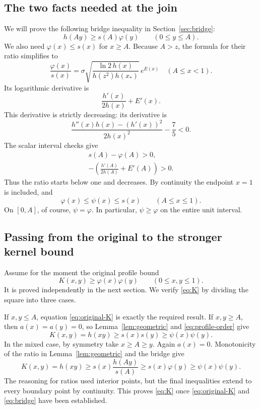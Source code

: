 \documentclass[11pt]{article}
\theoremstyle{remark}
\begin{document}
\subsection{The two facts needed at the join}
We will prove the following bridge inequality in
Section~\ref{sec:bridge}:
\begin{equation}\label{eq:bridge}
h(Ay)\ge s(A)\varphi(y)\qquad(0\le y\le A).
\end{equation}
We also need \(\varphi(x)\le s(x)\) for \(x\ge A\).
Because \(A>z\), the formula for their ratio simplifies to
\[
\frac{\varphi(x)}{s(x)}
=\sigma\sqrt{\frac{\ln2\,h(x)}{h(z^2)h(x_*)}}\,e^{E(x)}
\quad(A\le x<1).
\]
Its logarithmic derivative is
\[
\frac{h'(x)}{2h(x)}+E'(x).
\]
This derivative is strictly decreasing: its derivative is
\[
\frac{h''(x)h(x)-(h'(x))^2}{2h(x)^2}-\frac75<0.
\]
The scalar interval checks give
\begin{equation}\label{eq:tail-scalars}
\begin{gathered}
s(A)-\varphi(A)>0,\\
-\left(\frac{h'(A)}{2h(A)}+E'(A)\right)>0.
\end{gathered}
\end{equation}
Thus the ratio starts below one and decreases. By continuity the
endpoint \(x=1\) is included, and
\begin{equation}\label{eq:profile-order}
\varphi(x)\le\psi(x)\le s(x)\qquad(A\le x\le1).
\end{equation}
On \([0,A]\), of course, \(\psi=\varphi\). In particular,
\(\psi\ge\varphi\) on the entire unit interval.

\subsection{Passing from the original to the stronger kernel bound}
Assume for the moment the original profile bound
\begin{equation}\label{eq:original-K}
K(x,y)\ge\varphi(x)\varphi(y)\qquad(0\le x,y\le1).
\end{equation}
It is proved independently in the next section.
We verify \eqref{eq:K} by dividing the square into three cases.

If \(x,y\le A\), equation \eqref{eq:original-K} is exactly the
required result. If \(x,y\ge A\), then \(a(x)=a(y)=0\), so
Lemma~\ref{lem:geometric} and \eqref{eq:profile-order} give
\[
K(x,y)=h(xy)\ge s(x)s(y)\ge\psi(x)\psi(y).
\]
In the mixed case, by symmetry take \(x\ge A\ge y\).
Again \(a(x)=0\). Monotonicity of the ratio in
Lemma~\ref{lem:geometric} and the bridge give
\[
K(x,y)=h(xy)
\ge s(x)\frac{h(Ay)}{s(A)}
\ge s(x)\varphi(y)\ge\psi(x)\psi(y).
\]
The reasoning for ratios used interior points, but the final
inequalities extend to every boundary point by continuity.
This proves \eqref{eq:K} once \eqref{eq:original-K} and
\eqref{eq:bridge} have been established.
\end{document}
